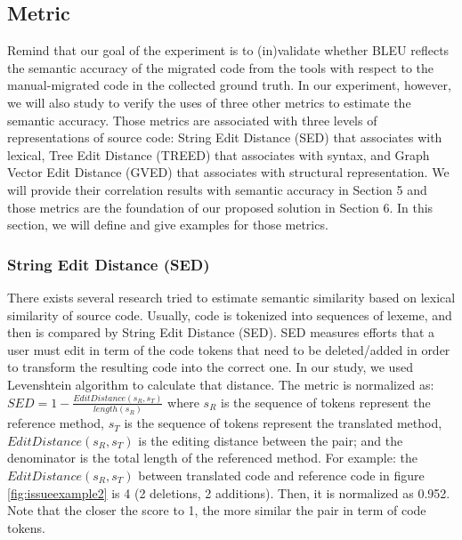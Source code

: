 \subsection{Metric} 
%

Remind that our goal of the experiment is to (in)validate whether BLEU reflects the semantic accuracy of the migrated code from the tools with respect to the manual-migrated code in the collected ground truth. In our experiment, however, we will also study to verify the uses of three other metrics to estimate the semantic accuracy. Those metrics are associated with three levels of representations of source code: String Edit Distance (SED) that associates with lexical, Tree Edit Distance (TREED) that associates with syntax, and Graph Vector Edit Distance (GVED) that associates with structural representation. We will provide their correlation results with semantic accuracy in Section 5 and those metrics are the foundation of our proposed solution in Section 6. In this section, we will define and give examples for those metrics. 

\subsubsection{\textbf{String Edit Distance (SED)}}There exists several research tried to estimate semantic similarity based on lexical similarity of source code. Usually, code is tokenized into sequences of lexeme, and then is compared by String Edit Distance (SED). SED measures efforts that a user must edit in term of the code tokens
that need to be deleted/added in order to transform the
resulting code into the correct one. In our study, we used Levenshtein algorithm to calculate that distance. The metric is normalized as:  $SED = 1 -  \frac{EditDistance\left(s_R, s_T\right)}{length\left(s_R\right)}$ where 
$s_R$ is the sequence of tokens represent the reference method, $s_T$ is the sequence of tokens represent the translated method, $EditDistance\left(s_R, s_T\right)$ is the editing distance between the pair; and the denominator is the total length of the referenced method. For example: the $EditDistance\left(s_R, s_T\right)$ between translated code and reference code in figure \ref{fig:issueexample2} is 4 (2 deletions, 2 additions). Then, it is normalized as 0.952. Note that the closer the score to 1, the more similar the pair in term of code tokens. 

